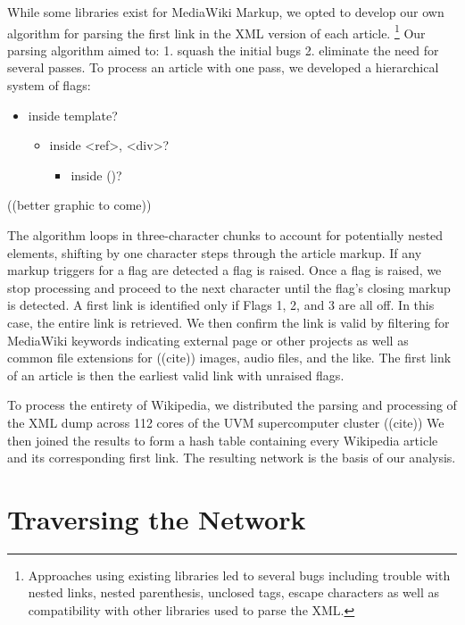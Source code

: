 \documentclass[twoside]{article}
\begin{document}
While some libraries exist for MediaWiki Markup, we opted to develop our own algorithm for parsing the first link in the XML version of each article. 
\footnote{Approaches using existing libraries led to several bugs 
including trouble with nested links, nested parenthesis, unclosed tags, escape characters 
as well as compatibility with other libraries used to parse the XML.}
Our parsing algorithm aimed to: 
1. squash the initial bugs 
2. eliminate the need for several passes. 
To process an article with one pass, we developed a hierarchical system of flags:
\begin{itemize}
    \item[Flag 1:] inside template?
    \begin{itemize}
        \item[Flag 2:] inside <ref>, <div>?
        \begin{itemize}
            \item[Flag 3:] inside ()?
        \end{itemize}
    \end{itemize}
\end{itemize}
((better graphic to come))

The algorithm loops in three-character chunks to account for potentially nested elements, 
shifting by one character steps through the article markup.
If any markup triggers for a flag are detected a flag is raised. 
Once a flag is raised, we stop processing and proceed to the next character
until the flag's closing markup is detected.
A first link is identified only if Flags 1, 2, and 3 are all off.
In this case, the entire link is retrieved. 
We then confirm the link is valid by filtering for MediaWiki keywords indicating external page or other projects
as well as common file extensions for 
((cite))
images, audio files, and the like.
The first link of an article is then the earliest valid link with unraised flags.

To process the entirety of Wikipedia, we distributed the parsing and processing of the XML dump
across 112 cores of the UVM supercomputer cluster
((cite))
We then joined the results to form a hash table containing every Wikipedia article and its corresponding
first link. The resulting network is the basis of our analysis.


\section{Traversing the Network}
\end{document}

